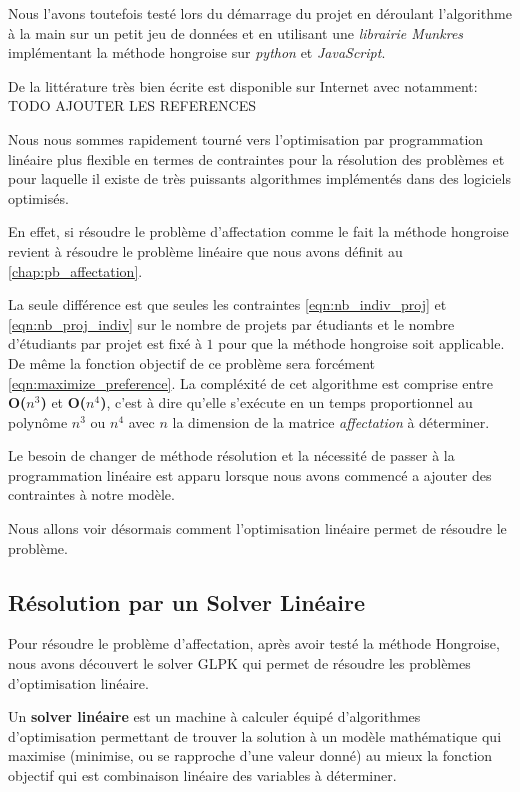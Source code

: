 \documentclass[final,poster]{polytech/polytech}
\begin{document}
Nous l'avons toutefois testé lors du démarrage du projet en déroulant l'algorithme à la main sur un petit jeu de données et en utilisant une \textit{librairie Munkres} implémentant la méthode hongroise sur \textit{python} et \textit{JavaScript}.

De la littérature très bien écrite est disponible sur Internet avec notamment: TODO AJOUTER LES REFERENCES

Nous nous sommes rapidement tourné vers l'optimisation par programmation linéaire plus flexible en termes de contraintes pour la résolution des problèmes et pour laquelle il existe de très puissants algorithmes implémentés dans des logiciels optimisés.

En effet, si résoudre le problème d'affectation comme le fait la méthode hongroise revient à résoudre le problème linéaire que nous avons définit au \autoref{chap:pb_affectation}.

La seule différence est que seules les contraintes \autoref{eqn:nb_indiv_proj} et \autoref{eqn:nb_proj_indiv} sur le nombre de projets par étudiants et le nombre d'étudiants par projet est fixé à $1$ pour que la méthode hongroise soit applicable.
De même la fonction objectif de ce problème sera forcément \autoref{eqn:maximize_preference}. La compléxité de cet algorithme est comprise entre \textbf{O($n^3$)} et  \textbf{O($n^4$)}, c'est à dire qu'elle s'exécute en un temps proportionnel au polynôme $n^3$ ou $n^4$ avec $n$ la dimension de la matrice \textit{affectation} à déterminer.

Le besoin de changer de méthode résolution et la nécessité de passer à la programmation linéaire est apparu lorsque nous avons commencé a ajouter des contraintes à notre modèle.

Nous allons voir désormais comment l'optimisation linéaire permet de résoudre le problème.

\subsection{Résolution par un Solver Linéaire}

Pour résoudre le problème d'affectation, après avoir testé la méthode Hongroise, nous avons découvert le solver GLPK qui permet de résoudre les problèmes d'optimisation linéaire.

Un \textbf{solver linéaire}  est un machine à calculer équipé d'algorithmes d'optimisation permettant de trouver la solution à un modèle mathématique qui maximise (minimise, ou se rapproche d'une valeur donné) au mieux la fonction objectif qui est combinaison linéaire des variables à déterminer.
\end{document}
